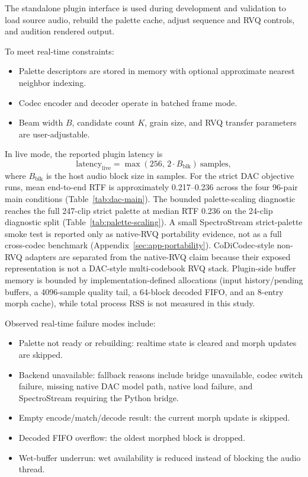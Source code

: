 \documentclass[twoside,a4paper]{article}
\begin{document}
The standalone plugin interface is used during development and validation to load source audio, rebuild the palette cache, adjust sequence and RVQ controls, and audition rendered output.

To meet real-time constraints:

\begin{itemize}
    \item Palette descriptors are stored in memory with optional approximate nearest neighbor indexing.
    \item Codec encoder and decoder operate in batched frame mode.
    \item Beam width $B$, candidate count $K$, grain size, and RVQ transfer parameters are user-adjustable.
\end{itemize}

In live mode, the reported plugin latency is
\begin{equation}
\text{latency}_{\mathrm{live}} = \max(256,\,2\cdot B_{\mathrm{blk}})\ \text{samples},
\end{equation}
where $B_{\mathrm{blk}}$ is the host audio block size in samples.
For the strict DAC objective runs, mean end-to-end RTF is approximately 0.217--0.236 across the four 96-pair main conditions (Table~\ref{tab:dac-main}). The bounded palette-scaling diagnostic reaches the full 247-clip strict palette at median RTF 0.236 on the 24-clip diagnostic split (Table~\ref{tab:palette-scaling}). A small SpectroStream strict-palette smoke test is reported only as native-RVQ portability evidence, not as a full cross-codec benchmark (Appendix~\ref{sec:app-portability}). CoDiCodec-style non-RVQ adapters are separated from the native-RVQ claim because their exposed representation is not a DAC-style multi-codebook RVQ stack. Plugin-side buffer memory is bounded by implementation-defined allocations (input history/pending buffers, a 4096-sample quality tail, a 64-block decoded FIFO, and an 8-entry morph cache), while total process RSS is not measured in this study.

Observed real-time failure modes include:
\begin{itemize}
    \item Palette not ready or rebuilding: realtime state is cleared and morph updates are skipped.
    \item Backend unavailable: fallback reasons include bridge unavailable, codec switch failure, missing native DAC model path, native load failure, and SpectroStream requiring the Python bridge.
    \item Empty encode/match/decode result: the current morph update is skipped.
    \item Decoded FIFO overflow: the oldest morphed block is dropped.
    \item Wet-buffer underrun: wet availability is reduced instead of blocking the audio thread.
\end{itemize}
\end{document}
